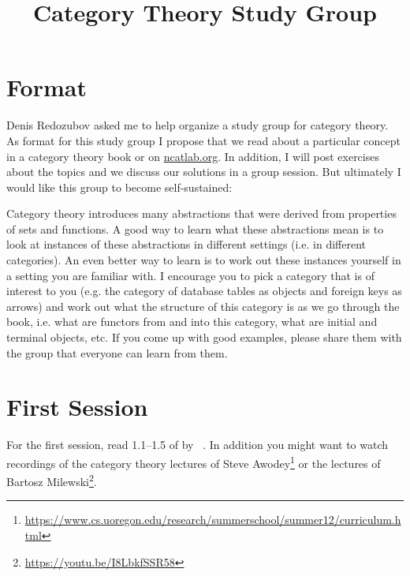 \documentclass{scrartcl}
\title{Category Theory Study Group}
\date{}
\begin{document}
\maketitle

\section*{Format}
Denis Redozubov asked me to help organize a study group for category theory.
As format for this study group I propose that we read about a particular concept in a category theory book or on \url{ncatlab.org}.
In addition, I will post exercises about the topics and we discuss our solutions in a group session. But ultimately I would like this group to become self-sustained:

Category theory introduces many abstractions that were derived from properties of sets and functions.
A good way to learn what these abstractions mean is to look at instances of these abstractions in different settings (i.e. in different categories).
An even better way to learn is to work out these instances yourself in a setting you are familiar with.
I encourage you to pick a category that is of interest to you (e.g. the category of database tables as objects and foreign keys as arrows) and work out what the structure of this category is as we go through the book, i.e. what are functors from and into this category, what are initial and terminal objects, etc.
If you come up with good examples, please share them with the group that everyone can learn from them.

\section*{First Session}
For the first session, read 1.1--1.5 of  by \citeauthor{Awodey2010}~\cite{Awodey2010}. In addition you might want to watch recordings of the category theory lectures of Steve Awodey\footnote{\url{https://www.cs.uoregon.edu/research/summerschool/summer12/curriculum.html}} or the lectures of Bartosz Milewski\footnote{\url{https://youtu.be/I8LbkfSSR58}}.
\end{document}

